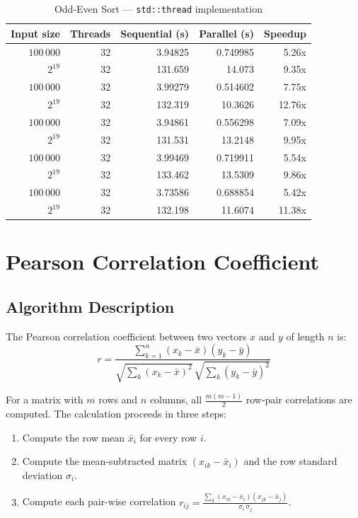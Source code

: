 \documentclass[11pt,a4paper]{article}
\begin{document}
\begin{table}[h]
\centering
\begin{tabular}{|r|r|r|r|r|}
\hline
\textbf{Input size} & \textbf{Threads} & \textbf{Sequential (s)} & \textbf{Parallel (s)} & \textbf{Speedup} \\
\hline
$100\,000$ & 32 & 3.94825 & 0.749985 & 5.26x \\
$2^{19}$ & 32 & 131.659 & 14.073 & 9.35x \\
$100\,000$ & 32 & 3.99279 & 0.514602 & 7.75x \\
$2^{19}$ & 32 & 132.319 & 10.3626 & 12.76x \\
$100\,000$ & 32 & 3.94861 & 0.556298 & 7.09x \\
$2^{19}$ & 32 & 131.531 & 13.2148 & 9.95x \\
$100\,000$ & 32 & 3.99469 & 0.719911 & 5.54x \\
$2^{19}$ & 32 & 133.462 & 13.5309 & 9.86x \\
$100\,000$ & 32 & 3.73586 & 0.688854 & 5.42x \\
$2^{19}$ & 32 & 132.198 & 11.6074 & 11.38x \\
\hline
\end{tabular}
\caption{Odd-Even Sort --- \texttt{std::thread} implementation}
\end{table}

\section{Pearson Correlation Coefficient}

\subsection{Algorithm Description}

The Pearson correlation coefficient between two vectors $x$ and $y$ of length $n$ is:
$$r = \frac{\sum_{k=1}^{n}(x_k - \bar{x})(y_k - \bar{y})}{\sqrt{\sum_{k}(x_k-\bar{x})^2}\,\sqrt{\sum_{k}(y_k-\bar{y})^2}}$$

For a matrix with $m$ rows and $n$ columns, all $\frac{m(m-1)}{2}$ row-pair correlations are
computed. The calculation proceeds in three steps:
\begin{enumerate}
    \item Compute the row mean $\bar{x}_i$ for every row $i$.
    \item Compute the mean-subtracted matrix $(x_{ik} - \bar{x}_i)$ and the row standard
          deviation $\sigma_i$.
    \item Compute each pair-wise correlation
          $r_{ij} = \frac{\sum_k (x_{ik}-\bar{x}_i)(x_{jk}-\bar{x}_j)}{\sigma_i\,\sigma_j}$.
\end{enumerate}
\end{document}
